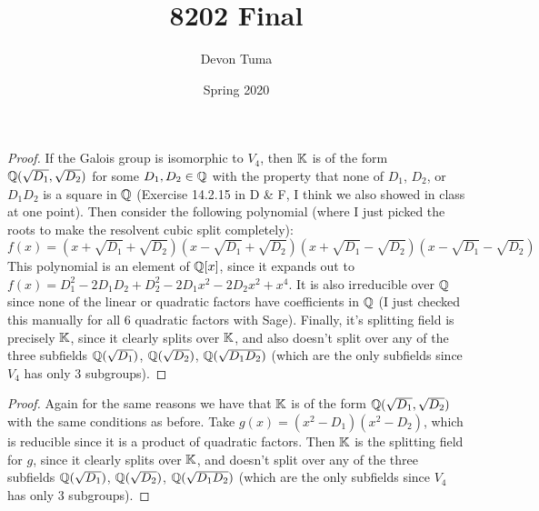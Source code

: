 \documentclass[11pt]{article}
\title{8202 Final}
\author{Devon Tuma}
\date{Spring 2020}
\begin{document}
\maketitle

\begin{proof}
  If the Galois group is isomorphic to $V_4$, then $\mathbb{K}$ is of the form $\mathbb{Q}(\sqrt{D_1},\sqrt{D_2})$ for some $D_1,D_2 \in \mathbb{Q}$ with the property that none of $D_1$, $D_2$, or $D_1D_2$ is a square in $\mathbb{Q}$ (Exercise 14.2.15 in D \& F, I think we also showed in class at one point).
  Then consider the following polynomial (where I just picked the roots to make the resolvent cubic split completely):
  \begin{equation*}
    f(x) = (x + \sqrt{D_1} + \sqrt{D_2})(x - \sqrt{D_1} + \sqrt{D_2})(x + \sqrt{D_1} - \sqrt{D_2})(x - \sqrt{D_1} - \sqrt{D_2})
  \end{equation*}
  This polynomial is an element of $\mathbb{Q}[x]$, since it expands out to $f(x) = D_1^2 - 2 D_1 D_2 + D_2^2 - 2 D_1 x^2 - 2 D_2 x^2 + x^4$.
  It is also irreducible over $\mathbb{Q}$ since none of the linear or quadratic factors have coefficients in $\mathbb{Q}$
  (I just checked this manually for all $6$ quadratic factors with Sage).
  Finally, it's splitting field is precisely $\mathbb{K}$, since it clearly splits over $\mathbb{K}$, and also doesn't split over any of the three subfields $\mathbb{Q}(\sqrt{D_1})$, $\mathbb{Q}(\sqrt{D_2})$, $\mathbb{Q}(\sqrt{D_1D_2})$ (which are the only subfields since $V_4$ has only $3$ subgroups).
\end{proof}

\begin{proof}
  Again for the same reasons we have that $\mathbb{K}$ is of the form $\mathbb{Q}(\sqrt{D_1},\sqrt{D_2})$ with the same conditions as before.
  Take $g(x) = (x^2 - D_1)(x^2 - D_2)$, which is reducible since it is a product of quadratic factors.
  Then $\mathbb{K}$ is the splitting field for $g$, since it clearly splits over $\mathbb{K}$, and doesn't split over any of the three subfields $\mathbb{Q}(\sqrt{D_1})$, $\mathbb{Q}(\sqrt{D_2})$, $\mathbb{Q}(\sqrt{D_1D_2})$ (which are the only subfields since $V_4$ has only $3$ subgroups).
\end{proof}
\end{document}
